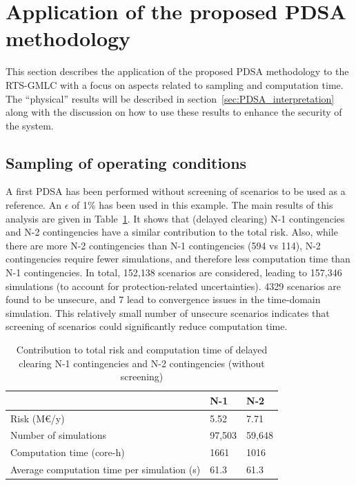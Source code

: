 \section{Application of the proposed PDSA methodology}
\label{sec:PDSA_results}

This section describes the application of the proposed PDSA methodology to the RTS-GMLC with a focus on aspects related to sampling and computation time. The ``physical'' results will be described in section~\ref{sec:PDSA_interpretation} along with the discussion on how to use these results to enhance the security of the system.



\subsection{Sampling of operating conditions}
\label{sec:PDSA_results_sampling}

A first PDSA has been performed without screening of scenarios to be used as a reference. An \(\epsilon\) of 1\% has been used in this example. The main results of this analysis are given in Table~\ref{tab:summary-N1N2}. It shows that (delayed clearing) N-1 contingencies and N-2 contingencies have a similar contribution to the total risk. Also, while there are more N-2 contingencies than N-1 contingencies (594 vs 114), N-2 contingencies require fewer simulations, and therefore less computation time than N-1 contingencies. In total, 152,138 scenarios are considered, leading to 157,346 simulations (to account for protection-related uncertainties). 4329 scenarios are found to be unsecure, and 7 lead to convergence issues in the time-domain simulation. This relatively small number of unsecure scenarios indicates that screening of scenarios could significantly reduce computation time.

\begin{table}
\centering
\caption{Contribution to total risk and computation time of delayed clearing N-1 contingencies and N-2 contingencies (without screening)}
\label{tab:summary-N1N2}
\begin{tabular}{@{}lll@{}}
\toprule
                                 & N-1  & N-2 \\ \midrule
Risk (M€/y) & 5.52 & 7.71 \\
Number of simulations            & 97,503 & 59,648 \\
Computation time (core-h)        & 1661  & 1016 \\
Average computation time per simulation (s) & 61.3 & 61.3 \\ \bottomrule
\end{tabular}
\end{table}


